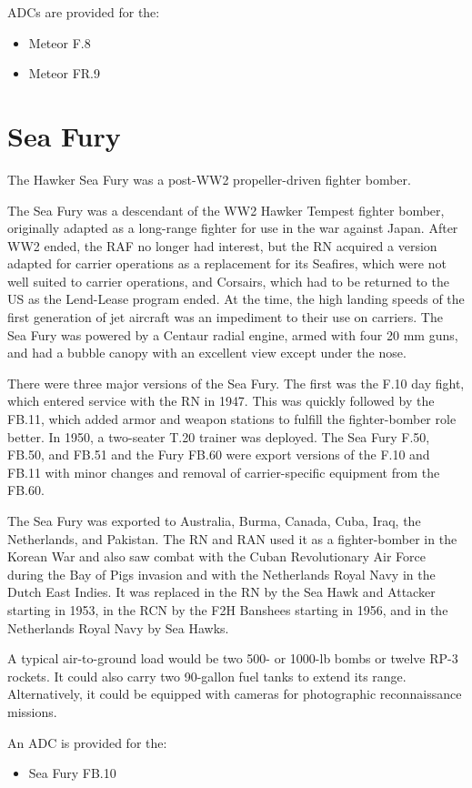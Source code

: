 ADCs are provided for the:
\begin{itemize}
\item Meteor F.8
\item Meteor FR.9
\end{itemize}

\section*{Sea Fury}

The Hawker Sea Fury was a post-WW2 propeller-driven fighter bomber. 

The Sea Fury was a descendant of the WW2 Hawker Tempest fighter bomber, originally adapted as a long-range fighter for use in the war against Japan. After WW2 ended, the RAF no longer had interest, but the RN acquired a version adapted for carrier operations as a replacement for its Seafires, which were not well suited to carrier operations, and Corsairs, which had to be returned to the US as the Lend-Lease program ended. At the time, the high landing speeds of the first generation of jet aircraft was an impediment to their use on carriers. The Sea Fury was powered by a Centaur radial engine, armed with four 20 mm guns, and had a bubble canopy with an excellent view except under the nose.

There were three major versions of the Sea Fury. The first was the F.10 day fight, which entered service with the RN in 1947. This was quickly followed by the FB.11, which added armor and weapon stations to fulfill the fighter-bomber role better. In 1950, a two-seater T.20 trainer was deployed. The Sea Fury F.50, FB.50, and FB.51 and the Fury FB.60 were export versions of the F.10 and FB.11 with minor changes and removal of carrier-specific equipment from the FB.60. 

The Sea Fury was exported to Australia, Burma, Canada, Cuba, Iraq, the Netherlands, and Pakistan. The RN and RAN used it as a fighter-bomber in the Korean War and also saw combat with the Cuban Revolutionary Air Force during the Bay of Pigs invasion and with the Netherlands Royal Navy in the Dutch East Indies. It was replaced in the RN by the Sea Hawk and Attacker starting in 1953, in the RCN by the F2H Banshees starting in 1956, and in the Netherlands Royal Navy by Sea Hawks.

A typical air-to-ground load would be two 500- or 1000-lb bombs or twelve RP-3 rockets. It could also carry two 90-gallon fuel tanks to extend its range. Alternatively, it could be equipped with cameras for photographic reconnaissance missions.

An ADC is provided for the:
\begin{itemize}
\item Sea Fury FB.10
\end{itemize}
